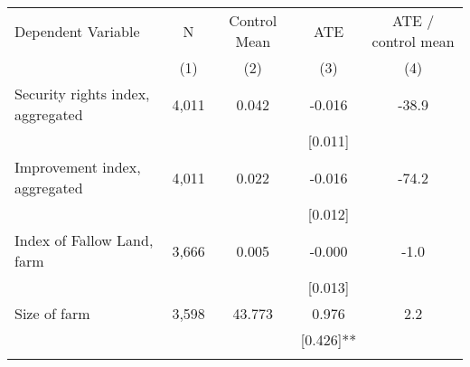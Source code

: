 \begin{tabular}{lcccc}
\hline \noalign{\smallskip}Dependent Variable & N & Control Mean & ATE & ATE / control mean\\
 & (1) & (2) & (3) & (4)\\
\noalign{\smallskip}\hline \noalign{\smallskip}Security rights index, aggregated & 4,011 & 0.042 & -0.016 & -38.9\\
 &  &  & [0.011] & \\
Improvement index, aggregated & 4,011 & 0.022 & -0.016 & -74.2\\
 &  &  & [0.012] & \\
Index of Fallow Land, farm & 3,666 & 0.005 & -0.000 & -1.0\\
 &  &  & [0.013] & \\
Size of farm & 3,598 & 43.773 & 0.976 & 2.2\\
 &  &  & [0.426]** & \\
\noalign{\smallskip}\hline\end{tabular}
